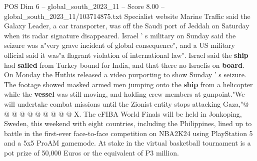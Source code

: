 \begin{textsample}{POS Dim 6 – global\_south\_2023\_11 – Score 8.00 – global\_south\_2023\_11/103714875.txt}
Specialist website Marine Traffic said the Galaxy Leader, a car transporter, was off the Saudi port of Jeddah on Saturday when its radar signature disappeared.
Israel ' s military on Sunday said the seizure was a"very grave incident of global consequence", and a US military official said it was"a flagrant violation of international law".
Israel said the \textbf{ship} had \textbf{sailed} from Turkey bound for India, and that there no Israelis on \textbf{board}.
On Monday the Huthis released a video purporting to show Sunday ' s seizure.
The footage showed masked armed men jumping onto the \textbf{ship} from a helicopter while the \textbf{vessel} was still moving, and holding crew members at gunpoint."We will undertake combat missions until the Zionist entity stops attacking Gaza,"@ @ @ @ @ @ @ @ @ @ X.
The eFIBA World Finals will be held in Jonkoping, Sweden, this weekend with eight countries, including the Philippines, lined up to battle in the first-ever face-to-face competition on NBA2K24 using PlayStation 5 and a 5x5 ProAM gamemode.
At stake in the virtual basketball tournament is a pot prize of 50,000 Euros or the equivalent of P3 million.

\end{textsample}
